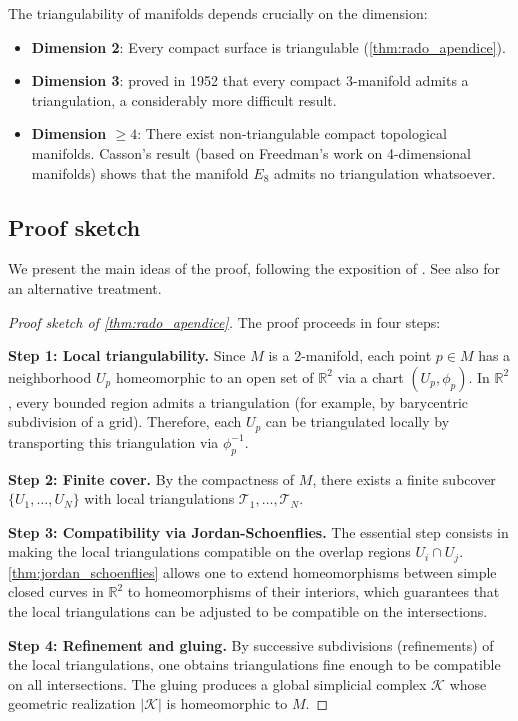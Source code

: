 \begin{remark}\label{rem:triangulabilidad_dimensiones}
The triangulability of manifolds depends crucially on the dimension:
\begin{itemize}
	\item \textbf{Dimension 2}: Every compact surface is triangulable (\autoref{thm:rado_apendice}).
	\item \textbf{Dimension 3}: \citet{moise1977geometric} proved in 1952 that every compact 3-manifold admits a triangulation, a considerably more difficult result.
	\item \textbf{Dimension $\geq 4$}: There exist non-triangulable compact topological manifolds. Casson's result (based on Freedman's work on 4-dimensional manifolds) shows that the manifold $E_8$ admits no triangulation whatsoever.
\end{itemize}
\end{remark}

\subsection*{Proof sketch}

We present the main ideas of the proof, following the exposition of \citet[Ch.~8]{moise1977geometric}. See also \citet[§77]{munkres2000topology} for an alternative treatment.

\begin{proof}[Proof sketch of \autoref{thm:rado_apendice}]
The proof proceeds in four steps:

\textbf{Step 1: Local triangulability.}
Since $M$ is a 2-manifold, each point $p \in M$ has a neighborhood $U_p$ homeomorphic to an open set of $\mathbb{R}^2$ via a chart $(U_p, \phi_p)$. In $\mathbb{R}^2$, every bounded region admits a triangulation (for example, by barycentric subdivision of a grid). Therefore, each $U_p$ can be triangulated locally by transporting this triangulation via $\phi_p^{-1}$.

\textbf{Step 2: Finite cover.}
By the compactness of $M$, there exists a finite subcover $\{U_1, \ldots, U_N\}$ with local triangulations $\mathcal{T}_1, \ldots, \mathcal{T}_N$.

\textbf{Step 3: Compatibility via Jordan-Schoenflies.}
The essential step consists in making the local triangulations compatible on the overlap regions $U_i \cap U_j$. \autoref{thm:jordan_schoenflies} allows one to extend homeomorphisms between simple closed curves in $\mathbb{R}^2$ to homeomorphisms of their interiors, which guarantees that the local triangulations can be adjusted to be compatible on the intersections.

\textbf{Step 4: Refinement and gluing.}
By successive subdivisions (refinements) of the local triangulations, one obtains triangulations fine enough to be compatible on all intersections. The gluing produces a global simplicial complex $\mathcal{K}$ whose geometric realization $|\mathcal{K}|$ is homeomorphic to $M$.
\end{proof}


